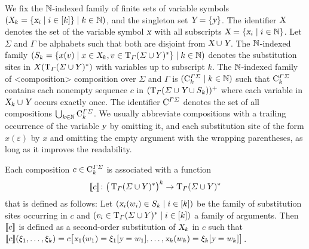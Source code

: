 \documentclass[../../document.tex]{subfiles}
\begin{document}
    \begin{definition}[Composition]
        We fix the \(\mathbb{N}\)-indexed family of finite sets of variable symbols \((\textsl{X}_k = \{\textsl{x}_i \mid i \in [k]\} \mid k \in \mathbb{N})\), and the singleton set \(\textsl{Y} = \{\textsl{y}\}\).
        The identifier \(\textsl{X}\) denotes the set of the variable symbol \(\textsl{x}\) with all subscripts \(\textsl{X} = \{\textsl{x}_i \mid i \in \mathbb{N}\}\).
        Let \(\varSigma\) and \(\varGamma\) be alphabets such that both are disjoint from \(\textsl{X} \cup \textsl{Y}\).
        The \(\mathbb{N}\)-indexed family \((S_k = \{x(v) \mid x \in \textsl{X}_k, v \in \operatorname{T}_\varGamma(\varSigma \cup Y)^*\} \mid k \in \mathbb{N})\) denotes the substitution sites in \(X(\operatorname{T}_\varGamma(\varSigma \cup Y)^*)\) with variables up to subscript \(k\).
        The \(\mathbb{N}\)-indexed family of <composition>{ composition} over \(\varSigma\) and \(\varGamma\) is \((\mathrm{C}^{\varGamma\varSigma}_k \mid k \in \mathbb{N})\) such that \(\mathrm{C}^{\varGamma\varSigma}_k\) contains each nonempty sequence \(c\) in \((\operatorname{T}_\varGamma(\varSigma \cup \textsl{Y} \cup S_k))^+\) where each variable in \(\textsl{X}_k \cup \textsl{Y}\) occurs exactly once.
        The identifier \(\mathrm{C}^{\varGamma\varSigma}\) denotes the set of all  compositions \(\bigcup_{k \in \mathbb{N}} \mathrm{C}^{\varGamma\varSigma}_{k}\).
        We usually abbreviate compositions with a trailing occurrence of the variable \(\textsl{y}\) by omitting it, and each substitution site of the form \(x(\varepsilon)\) by \(x\) and omitting the empty argument with the wrapping parentheses, as long as it improves the readability.

        Each composition \(c \in \mathrm{C}^{\varGamma\varSigma}_k\) is associated with a function \[
            \llbracket c\rrbracket\colon \big(\operatorname{T}_\varGamma(\varSigma \cup Y)^*\big)^k \to \operatorname{T}_\varGamma(\varSigma \cup Y)^*
        \] that is defined as follows:
            Let \((\textsl{x}_i(w_i) \in S_k \mid i \in [k])\) be the family of substitution sites occurring in \(c\) and \((v_i \in \operatorname{T}_\varGamma(\varSigma \cup Y)^* \mid i \in [k])\) a family of arguments.
            Then \(\llbracket c\rrbracket\) is defined as a second-order substitution of \(\textsl{X}_k\) in \(c\) such that \(\llbracket c\rrbracket(\xi_1, \ldots, \xi_k) = c\big[\textsl{x}_1(w_1)=\xi_1[\textsl{y}=w_1], \ldots, \textsl{x}_k(w_k)=\xi_k[\textsl{y}=w_k]\big]\).
    \end{definition}

\end{document}
